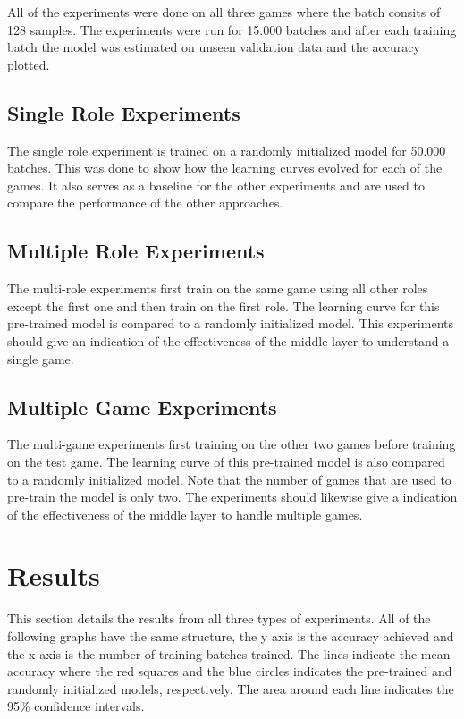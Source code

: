 \documentclass[twocolumn, letterpaper, 10 pt, conference]{ieeeconf}  %
\begin{document}
    All of the experiments were done on all three games where the batch consits of 128 samples. The experiments were run for 15.000 batches and after each training batch the model was estimated on unseen validation data and the accuracy plotted.  
    
    \subsection{Single Role Experiments}
        The single role experiment is trained on a randomly initialized model for 50.000 batches. This was done to show how the learning curves evolved for each of the games. It also serves as a baseline for the other experiments and are used to compare the performance of the other approaches. 
    
    \subsection{Multiple Role Experiments}
        The multi-role experiments first train on the same game using all other roles except the first one and then train on the first role. The learning curve for this pre-trained model is compared to a randomly initialized model. This experiments should give an indication of the effectiveness of the middle layer to understand a single game.
    
    \subsection{Multiple Game Experiments}
        The multi-game experiments first training on the other two games before training on the test game. The learning curve of this pre-trained model is also compared to a randomly initialized model. Note that the number of games that are used to pre-train the model is only two. The experiments should likewise give a indication of the effectiveness of the middle layer to handle multiple games. 


\section{Results}
This section details the results from all three types of experiments. All of the following graphs have the same structure, the y axis is the accuracy achieved and the x axis is the number of training batches trained. The lines indicate the mean accuracy where the red squares and the blue circles indicates the pre-trained and randomly initialized models, respectively. The area around each line indicates the 95\% confidence intervals.
\end{document}
